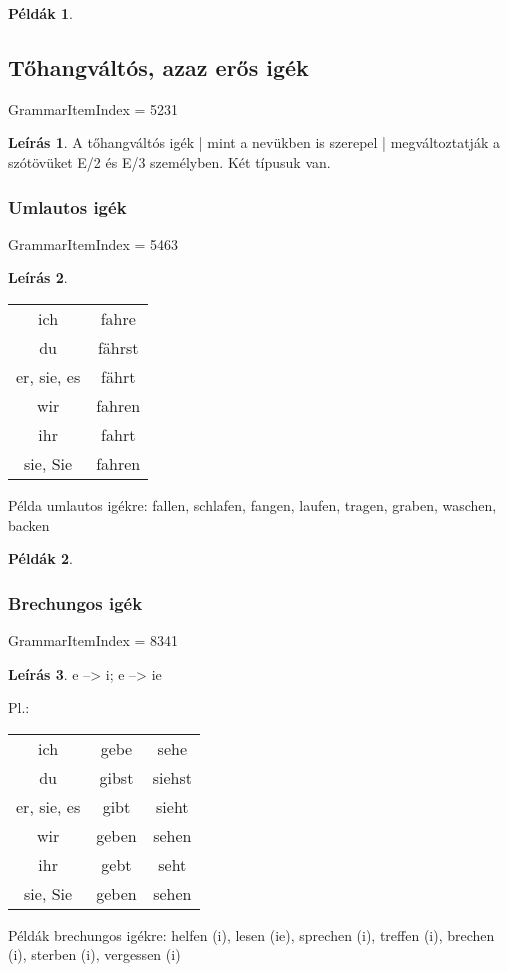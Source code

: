 \documentclass{article}
\theoremstyle{definition}
\newtheorem*{exmp}{Példák}
\newtheorem*{desc}{Leírás}
\begin{document}
\begin{exmp}
\end{exmp}

\subsection{Tőhangváltós, azaz erős igék}

GrammarItemIndex = 5231

\begin{desc}
A tőhangváltós igék | mint a nevükben is szerepel | megváltoztatják a szótövüket E/2 és E/3 személyben. Két típusuk van.
\end{desc}

\subsubsection{Umlautos igék}

GrammarItemIndex = 5463

\begin{desc}
\begin{tabular}{cc}
 ich & fahre \\
 du & fährst \\
 er, sie, es & fährt \\
 wir & fahren \\
 ihr & fahrt \\
 sie, Sie & fahren \\
\end{tabular}

Példa umlautos igékre: fallen, schlafen, fangen, laufen, tragen, graben, waschen, backen
\end{desc}

\begin{exmp}
\end{exmp}

\subsubsection{Brechungos igék}

GrammarItemIndex = 8341

\begin{desc}
e --> i; e --> ie

Pl.:

\begin{tabular}{ccc}
 ich & gebe & sehe \\
 du & gibst & siehst\\
 er, sie, es & gibt & sieht \\
 wir & geben & sehen \\
 ihr & gebt & seht \\
 sie, Sie & geben & sehen \\
\end{tabular}

Példák brechungos igékre: helfen (i), lesen (ie), sprechen (i), treffen (i), brechen (i), sterben (i), vergessen (i)
\end{desc}
\end{document}
